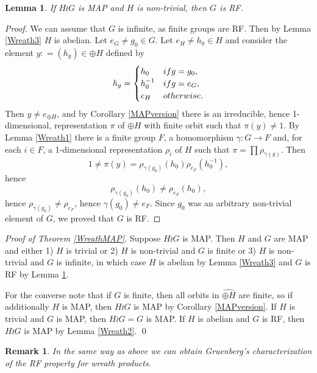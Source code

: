 \documentclass[11 pt, leqno, hidelinks]{amsart}%
\theoremstyle{plain}
\newtheorem{lemma}[theorem]{Lemma}
\newtheorem{remark}[theorem]{Remark}
\numberwithin{equation}{section}
\begin{document}
\medskip

\begin{lemma}\label{Wreath4} If $H\wr G$ is MAP and $H$ is non-trivial, then $G$ is RF.
\end{lemma}
\begin{proof} We can assume that $G$ is infinite, as finite groups are RF. Then by Lemma \ref{Wreath3} $H$ is abelian. Let $e_G \neq g_0 \in G$. Let $e_H \neq h_0 \in H$ and consider the element $ y: = (h_g) \in \oplus H$ defined by
$$h_g = \begin{cases} h_0 &\textup{ if } g= g_0, \\ h_0^{-1} &\textup{ if } g= e_G, \\ e_H &\textup{ otherwise. }\end{cases} $$
 Then $y\neq e_{\oplus H}$,  and by Corollary \ref{MAPversion} there is an irreducible, hence 1-dimensional, representation $\pi$ of $\oplus H$ with finite orbit such that $\pi(y) \neq 1$.  By Lemma \ref{Wreath1} there is a finite group $F$, a homomorphism $\gamma: G \to F$ and, for each $i\in F$, a 1-dimensional representation $\rho_i$ of $H$ such that $\pi  = \prod \rho_{\gamma(g)}.$
Then
$$1\neq \pi(y) = \rho_{\gamma(g_0)}(h_0)\rho_{e_F}(h_0^{-1}), $$ hence
$$\rho_{\gamma(g_0)}(h_0) \neq \rho_{e_F}(h_0), $$ hence
$\rho_{\gamma(g_0)} \neq \rho_{e_F}$, hence $\gamma(g_0) \neq e_F$. Since $g_0$ was an arbitrary non-trivial element of $G$, we proved that $G$ is RF.
\end{proof}

\medskip

{\it Proof of Theorem \ref{WreathMAP}.}  Suppose $H\wr G$ is MAP.  Then $H$ and $G$ are MAP and either 1) $H$ is trivial or 2) $H$ is non-trivial and $G$ is finite
or 3) $H$ is non-trivial and $G$ is infinite, in which case $H$ is abelian by Lemma \ref{Wreath3} and $G$ is RF by Lemma \ref{Wreath4}.


For the converse note that if $G$ is finite, then all orbits in $\widehat{\oplus H}$ are finite, so if additionally $H$ is MAP, then $H\wr G$ is MAP by Corollary \ref{MAPversion}. If $H$ is trivial  and $G$ is MAP, then $H\wr G = G$ is MAP. If $H$ is abelian and $G$ is RF, then $H\wr G$ is MAP by Lemma \ref{Wreath2}. \qed

\medskip

\begin{remark} In the same way as above we can obtain Gruenberg's  characterization of the RF property for wreath products.
\end{remark}
\end{document}
